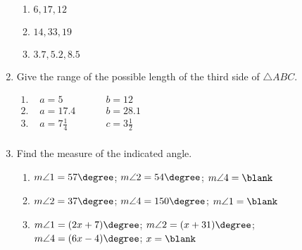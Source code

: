 \begin{enumerate}[label = \Alph*. ]
\begin{multicols}{3}
\begin{enumerate}[label = \arabic*. ]
\item \hspce $6, 17, 12$
\item \hspce $14, 33, 19$
\item \hspce $3.7, 5.2, 8.5$

\end{enumerate}  

\end{multicols}

\item \hspce Give the range of the possible length of the third side of $\triangle ABC$. 

\vspace*{4ex}\hspace*{15em}
\vspace*{-6ex}


$
\begin{array}{llll}
1. \phantom{i} & a=5 & \phantom{mn} & b=12 \\
2. &	a=17.4 &	& b=28.1 \\
3. &	a=7 \displaystyle \frac{1}{4} &	& c=3 \displaystyle \frac{1}{2}\\
\end{array}
$

\item \hspce Find the measure of the indicated angle. 
\begin{enumerate}[label = \arabic*. ]
\item $m\angle{1} = 57\degree$; $m\angle{2} = 54\degree$; $ m\angle{4} = \blank$
\item $m\angle{2} = 37\degree$; $ m\angle{4} = 150\degree$; $ m\angle{1} = \blank$
\item $m\angle{1} = (2x+7)\degree$; $ m\angle{2} = (x+31)\degree$; $ m\angle{4} = (6x-4)\degree$; $ x = \blank$
\end{enumerate}  

\end{enumerate} 

\vspace*{-16ex}\hspace*{22em}
\vspace*{4ex}
